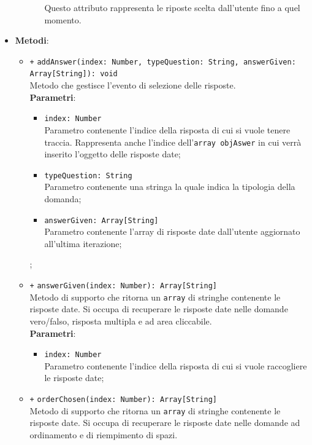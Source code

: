 \begin{itemize}
\begin{itemize}
\begin{itemize}
			Questo attributo rappresenta le riposte scelta dall'utente fino a quel momento.
		\end{itemize}
	\end{itemize}
	\item \textbf{Metodi}: 
	\begin{itemize}
		\item \texttt{+} \texttt{addAnswer(index: Number, typeQuestion: String, answerGiven: Array[String]): void} \\
		Metodo che gestisce l'evento di selezione delle risposte. \\
		\textbf{Parametri}:
		\begin{itemize}
			\item \texttt{index: Number} \\
			Parametro contenente l'indice della risposta di cui si vuole tenere traccia. Rappresenta anche l'indice dell'\texttt{array objAswer} in cui verrà inserito l'oggetto delle risposte date;
			\item \texttt{typeQuestion: String} \\
			Parametro contenente una stringa la quale indica la tipologia della domanda;
			\item \texttt{answerGiven: Array[String]} \\
			Parametro contenente l'array di risposte date dall'utente aggiornato all'ultima iterazione;
		\end{itemize};
		\item \texttt{+} \texttt{answerGiven(index: Number): Array[String]} \\
		Metodo di supporto che ritorna un \texttt{array} di stringhe contenente le risposte date. Si occupa di recuperare le risposte date nelle domande vero/falso, risposta multipla e ad area cliccabile.\\
		\textbf{Parametri}:
		\begin{itemize}
			\item \texttt{index: Number} \\
			Parametro contenente l'indice della risposta di cui si vuole raccogliere le risposte date; 
		\end{itemize}
		\item \texttt{+} \texttt{orderChosen(index: Number): Array[String]} \\
		Metodo di supporto che ritorna un \texttt{array} di stringhe contenente le risposte date. Si occupa di recuperare le risposte date nelle domande ad ordinamento e di riempimento di spazi.\\

\end{itemize}
\end{itemize}
